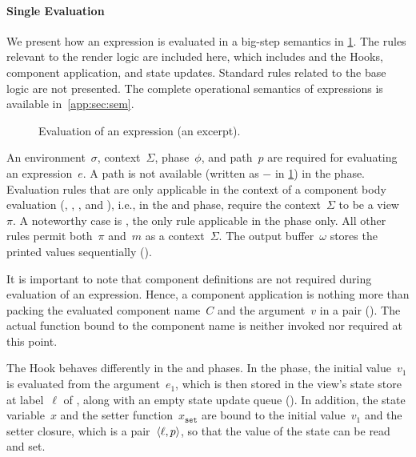 \paragraph{Single Evaluation}
We present how an expression is evaluated in a big-step semantics in \cref{fig:eval}.
The rules relevant to the render logic are included here, which includes  and the  Hooks, component application, and state updates.
Standard rules related to the base logic are not presented.
The complete operational semantics of expressions is available in~\cref{app:sec:sem}.
\begin{figure}[thbp]
  \centering
  \hfill{}
  \begin{mathparpagebreakable}
    
  \end{mathparpagebreakable}
  \caption{Evaluation of an expression (an excerpt).}\label{fig:eval}
\end{figure}

An environment~$\sigma$, context~$\Sigma$, phase~$\phi$, and path~$p$ are required for evaluating an expression~$e$.
A path is not available (written as $-$ in \cref{fig:eval}) in the  phase.
Evaluation rules that are only applicable in the context of a component body evaluation (, , , and ), i.e., in the  and  phase, require the context~$\Sigma$ to be a view~$\pi$.
A noteworthy case is , the only rule applicable in the  phase only.
All other rules permit both~$\pi$ and~$m$ as a context~$\Sigma$.
The output buffer~$\omega$ stores the printed values sequentially ().

It is important to note that component definitions are not required during evaluation of an expression.
Hence, a component application is nothing more than packing the evaluated component name~$C$ and the argument~$v$ in a pair ().
The actual function bound to the component name is neither invoked nor required at this point.

The  Hook behaves differently in the  and  phases.
In the  phase, the initial value~$v_1$ is evaluated from the argument~$e_1$, which is then stored in the view's state store  at label~$\ell$ of , along with an empty state update queue  ().
In addition, the state variable~$x$ and the setter function~$x_{\texttt{set}}$ are bound to the initial value~$v_1$ and the setter closure, which is a pair~$\langle\ell, p\rangle$, so that the value of the state can be read and set.

